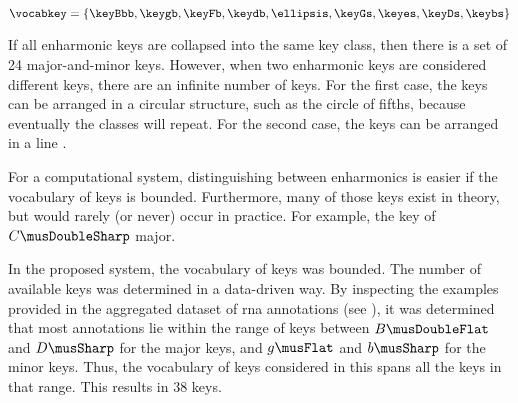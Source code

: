 
\begin{equation}
    \vocabkey = \{ \keyBbb, \keygb, \keyFb, \keydb, \ellipsis,
    \keyGs, \keyes, \keyDs, \keybs \}
\end{equation}

If all enharmonic keys are collapsed into the same key
class, then there is a set of 24 major-and-minor keys.
However, when two enharmonic keys are considered different
keys, there are an infinite number of keys. For the first
case, the keys can be arranged in a circular structure, such
as the circle of fifths, because eventually the classes will
repeat. For the second case, the keys can be arranged in a
line \parencite{temperley2000line}.

For a computational system, distinguishing between
enharmonics is easier if the vocabulary of keys is bounded.
Furthermore, many of those keys exist in theory, but would
rarely (or never) occur in practice. For example, the key of
$C\musDoubleSharp$ major.

In the proposed system, the vocabulary of keys was bounded.
The number of available keys was determined in a data-driven
way. By inspecting the examples provided in the aggregated
dataset of \gls{rna} annotations (see
), it was determined
that most annotations lie within the range of keys between
$B\musDoubleFlat$ and $D\musSharp$ for the major keys, and
$g\musFlat$ and $b\musSharp$ for the minor keys. Thus, the
vocabulary of keys considered in this \thesisdiss{} spans
all the keys in that range. This results in 38 keys.

